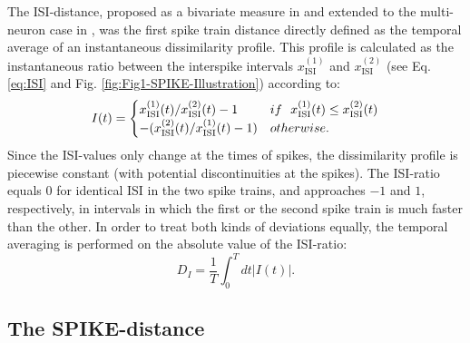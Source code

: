 \documentclass[10pt,twocolumn]{elsart5p}
\begin{document}
The ISI-distance, proposed as a bivariate measure in \citep{Kreuz07c} and extended to the multi-neuron case in \citep{Kreuz09}, was the first spike train distance directly defined as the temporal average of an instantaneous dissimilarity profile. This profile is calculated as the instantaneous ratio between the interspike intervals $x_{\mathrm {ISI}}^{(1)}$ and $x_{\mathrm {ISI}}^{(2)}$ (see Eq. \ref{eq:ISI} and Fig. \ref{fig:Fig1-SPIKE-Illustration}) according to:
%
\begin{equation} \label{eq:ISI-Ratio}
    I (t) = \begin{cases}
           x_{\mathrm {ISI}}^{(1)} (t) / x_{\mathrm {ISI}}^{(2)} (t) - 1 & {\rm if} ~~ x_{\mathrm {ISI}}^{(1)} (t) \leq x_{\mathrm {ISI}}^{(2)} (t) \cr
                      - (x_{\mathrm {ISI}}^{(2)} (t) / x_{\mathrm {ISI}}^{(1)} (t) -1)     & {\rm otherwise}.
                  \end{cases}
\end{equation}
%
Since the ISI-values only change at the times of spikes, the dissimilarity profile is piecewise constant (with potential discontinuities at the spikes). The ISI-ratio equals $0$ for identical ISI in the two spike trains, and approaches $-1$ and $1$, respectively, in intervals in which the first or the second spike train is much faster than the other. In order to treat both kinds of deviations equally, the temporal averaging is performed on the absolute value of the ISI-ratio:
%
\begin{equation} \label{eq:Temporal-Average}
    D_I = \frac{1}{T} \int_{0}^T dt |I (t)|.
\end{equation}


\subsection{\label{ss:SPIKE-Distance} The SPIKE-distance}
\end{document}
